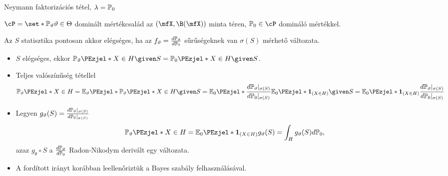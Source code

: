 \documentclass[aspectratio=169,notheorems,9pt,\option]{beamer}
\begin{document}
\begin{frame}{Neymann faktorizációs tétel, $\lambda=\P[0]$}
\begin{theorem}
  $\cP=\set*{\P[\theta]}{\theta\in\Theta}$ dominált mértékcsalád az 
  $(\mfX,\B(\mfX))$ minta téren, $\P[0]\in\cP$ domináló mértékkel. 
  
  Az $S$  statisztika pontosan akkor elégséges, ha az 
  $f_\theta=\frac{d\P[\theta]}{d\P[0]}$ 
  sűrűségeknek van $\sigma(S)$ mérhető változata.
\end{theorem}
\begin{itemize}
  \item $S$ elégséges, ekkor $\P[\theta]{X\in H\given S}=\P[0]{X\in H\given S}$.
  \item Teljes valószínűség tétellel
  \begin{displaymath}
    \P[\theta]{X\in H}
    =\E[\theta]{\P[\theta]{X\in H\given S}}
    =\E[0]{\frac{d\P[\theta]|_{\sigma(S)}}{d\P[0]|_{\sigma(S)}}\E[0]{\I{X\in H}\given S}}
    =\E[0]{\I{X\in H}\frac{d\P[\theta]|_{\sigma(S)}}{d\P[0]|_{\sigma(S)}}}
  \end{displaymath}
  \item Legyen $g_\theta(S)=\frac{d\P[\theta]|_{\sigma(S)}}{d\P[0]|_{\sigma(S)}}$
  \begin{displaymath}
    \P[\theta]{X\in H}=\E[0]{\I{X\in H}g_\theta(S)}=\int_H g_\theta(S)d\P[0],
  \end{displaymath}
  azaz $g_\theta\circ S$  a $\frac{d\P[\theta]}{d\P[0]}$ Radon-Nikodym derivált egy változata.
  \item A fordított irányt korábban leellenőriztük a Bayes szabály felhasználásával.
\end{itemize}
\end{frame}
\end{document}
